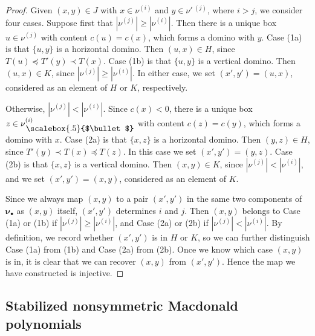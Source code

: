 \documentclass[12pt]{amsart}
\theoremstyle{definition}
\theoremstyle{remark}
\newcommand{\nubold}{{\boldsymbol \nu }}
\newcommand{\sgnlt}{\prec}
\newcommand{\sgnle}{\preccurlyeq}
\newcommand{\baug}{\bullet }
\newcommand{\aug}{\raisebox{.12ex}{\scalebox{.5}{$\baug $}}}
\begin{document}
\begin{proof}
Given $(x,y)\in J$ with $x\in \nu ^{(i)}$ and $y\in \nu '\, ^{(j)}$,
where $i>j$, we consider four cases.  Suppose first that $|\nu ^{(j)}|
\geq |\nu ^{(i)}|$.  Then there is a unique box $u\in \nu ^{(j)}$ with
content $c(u) = c(x)$, which forms a domino with $y$.  Case (1a) is
that $\{u ,y \}$ is a horizontal domino.  Then $(u, x)\in H$, since
$T(u) \sgnle T'(y) \sgnlt T(x)$.  Case (1b) is that $\{u, y \}$ is a
vertical domino.  Then $(u, x)\in K$, since $|\nu ^{(j)}| \geq |\nu
^{(i)}|$.  In either case, we set $(x',y') = (u, x)$, considered as an
element of $H$ or $K$, respectively.

Otherwise, $|\nu ^{(j)}| < |\nu ^{(i)}|$.  Since $c(x)<0$, there is a
unique box $z\in \nu _{\, \aug }^{(i)}$ with content $c(z) = c(y)$,
which forms a domino with $x$.  Case (2a) is that $\{x ,z \}$ is a
horizontal domino.  Then $(y,z)\in H$, since $T'(y) \sgnlt T(x) \sgnle
T(z)$.  In this case we set $(x',y') = (y,z)$.  Case (2b) is that
$\{x,z \}$ is a vertical domino.  Then $(x, y)\in K$, since $|\nu
^{(j)}| < |\nu ^{(i)}|$, and we set $(x',y') =(x,y)$, considered as an
element of $K$.

Since we always map $(x,y)$ to a pair $(x',y')$ in the same two
components of $\nubold _{\baug }$ as $(x,y)$ itself, $(x',y')$
determines $i$ and $j$.  Then $(x,y)$ belongs to Case (1a) or (1b) if
$|\nu ^{(j)}| \geq |\nu ^{(i)}|$, and Case (2a) or (2b) if $|\nu
^{(j)}| < |\nu ^{(i)}|$.  By definition, we record whether $(x',y')$
is in $H$ or $K$, so we can further distinguish Case (1a) from (1b)
and Case (2a) from (2b).  Once we know which case $(x,y)$ is in, it is
clear that we can recover $(x,y)$ from $(x',y')$.  Hence the
map we have constructed is injective.
\end{proof}


\subsection{Stabilized nonsymmetric Macdonald polynomials}
\label{ss:stabilization}
\end{document}
